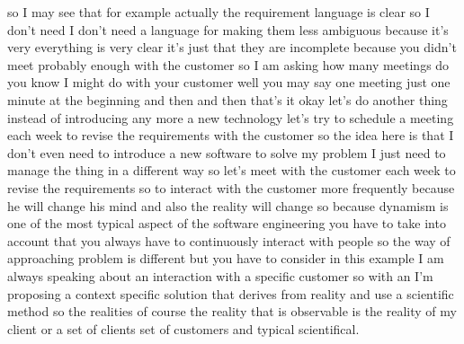 \documentclass[conference, compsoc, twoside]{IEEEtran}
\begin{document}
so I may see that 
for example actually the requirement language is clear 
so I don't need I don't need a language for making them less ambiguous because it's very everything is very clear it's just that they are incomplete because you didn't meet probably enough with the customer 
so I am asking how many meetings do you know I might do with your customer well you may say one meeting just one minute at the beginning and then and then that's it okay let's do another thing instead of introducing any more a new technology let's try to schedule a meeting each week to revise the requirements with the customer so the idea here is that I don't even need to introduce a new software to solve my problem I just need to manage the thing in a different way so let's meet with the customer each week to revise the requirements so to interact with the customer more frequently because he will change his mind and also the reality will change so because dynamism is one of the most typical aspect of the software engineering you have to take into account that you always have to continuously interact with people so the way of approaching problem is different but you have to consider in this example I am always speaking about an interaction with a specific customer so with an I'm proposing a context specific solution that derives from reality and use a scientific method so the realities of course the reality that is observable is the reality of my client or a set of clients set of customers and typical scientifical. 
\end{document}
